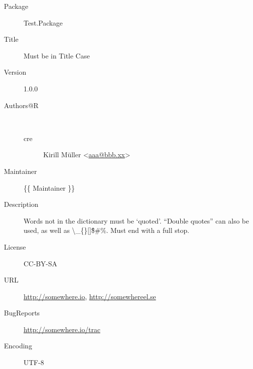 \begin{description}
  \raggedright{}
  \item[Package] Test.Package
  \item[Title] Must be in Title Case
  \item[Version] 1.0.0
  \item[Authors@R] ~\\
    \begin{description}
      \item[cre] Kirill Müller <\href{mailto:aaa@bbb.xx}{aaa@bbb.xx}>
    \end{description}
  \item[Maintainer] \{\{ Maintainer \}\}
  \item[Description] Words not in the dictionary must be `quoted'. ``Double quotes'' can also be used, as well as \textbackslash \_\{\}[]\^\$\#\%. Must end with a full stop.
  \item[License] CC-BY-SA
  \item[URL] \url{http://somewhere.io}, \url{http://somewhereel.se}
  \item[BugReports] \url{http://somewhere.io/trac}
  \item[Encoding] UTF-8
\end{description}

